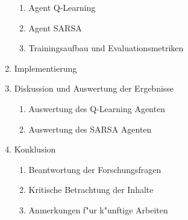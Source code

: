 \begin{enumerate}
\begin{enumerate}
        \item Agent Q-Learning
        \item Agent SARSA
        \item Trainingsaufbau und Evaluationsmetriken
        \end{enumerate}
    \item Implementierung
    \item Diskussion und Auswertung der Ergebnisse
        \begin{enumerate}
        \item Auswertung des Q-Learning Agenten
        \item Auswertung des SARSA Agenten
        \end{enumerate}
    \item Konklusion
        \begin{enumerate}
        \item Beantwortung der Forschungsfragen
        \item Kritische Betrachtung der Inhalte
        \item Anmerkungen f"ur k"unftige Arbeiten
        \end{enumerate}   
\end{enumerate}

